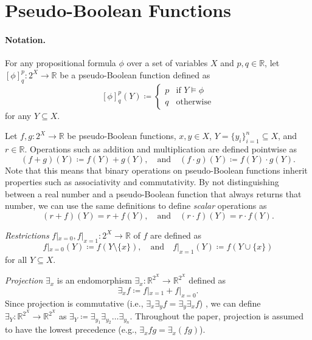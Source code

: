 \documentclass[runningheads]{llncs}
\begin{document}
\section{Pseudo-Boolean Functions}

\paragraph{Notation.} For any propositional formula $\phi$ over a set of
variables $X$ and $p, q \in \mathbb{R}$, let $[\phi]^p_q\colon 2^X \to
\mathbb{R}$ be a pseudo-Boolean function defined as
\[
  [\phi]^p_q(Y) \coloneqq
  \begin{cases}
    p & \text{if } Y \models \phi \\
    q & \text{otherwise}
  \end{cases}
\]
for any $Y \subseteq X$.

\begin{definition}[Operations] \label{def:operations}
  Let $f, g\colon 2^X \to \mathbb{R}$ be pseudo-Boolean functions, $x, y \in X$,
  $Y = \{y_i\}_{i=1}^n \subseteq X$, and $r \in \mathbb{R}$. Operations such as
  addition and multiplication are defined pointwise as
  \[
    (f+g)(Y) \coloneqq f(Y)+g(Y), \quad \text{and} \quad (f \cdot g)(Y)
    \coloneqq f(Y) \cdot g(Y).
  \]
  Note that this means that binary operations on pseudo-Boolean functions
  inherit properties such as associativity and commutativity. By not
  distinguishing between a real number and a pseudo-Boolean function that always
  returns that number, we can use the same definitions to define \emph{scalar}
  operations as
  \[
    (r+f)(Y) = r+f(Y), \quad \text{and} \quad (r \cdot f)(Y) = r \cdot f(Y).
  \]

  \emph{Restrictions} $f|_{x=0}, f|_{x=1}\colon 2^X \to \mathbb{R}$ of $f$ are
  defined as
  \[
    f|_{x=0}(Y) \coloneqq f(Y \setminus \{x\}), \quad \text{and} \quad
    f|_{x=1}(Y) \coloneqq f(Y \cup \{x\})
  \]
  for all $Y \subseteq X$.

  \emph{Projection} $\exists_x$ is an endomorphism $\exists_x\colon
  \mathbb{R}^{2^X} \to \mathbb{R}^{2^X}$ defined as
  \[
    \exists_xf \coloneqq f|_{x=1} + f|_{x=0}.
  \]
  Since projection is commutative (i.e., $\exists_x\exists_yf =
  \exists_y\exists_xf$) \cite{DBLP:conf/aaai/DudekPV20,DBLP:conf/cp/DudekPV20},
  we can define $\exists_Y\colon \mathbb{R}^{2^X} \to \mathbb{R}^{2^X}$ as
  $\exists_Y \coloneqq \exists_{y_1}\exists_{y_2}\dots\exists_{y_n}$. Throughout
  the paper, projection is assumed to have the lowest precedence (e.g.,
  $\exists_x fg = \exists_x (fg)$).
\end{definition}
\end{document}
